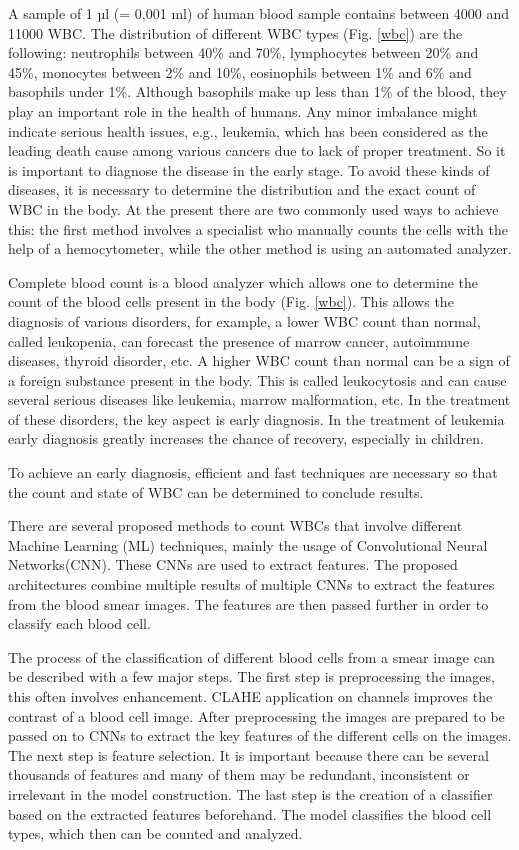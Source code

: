 A sample of 1 µl (= 0,001 ml) of human blood sample contains between 4000 and 11000 WBC. The distribution of different WBC types (Fig. \ref{wbc}) are the following: neutrophils between 40\% and 70\%, lymphocytes between 20\% and 45\%, monocytes between 2\% and 10\%, eosinophils between 1\% and 6\% and basophils under 1\%. Although basophils make up less than 1\% of the blood, they play an important role in the health of humans. Any minor imbalance might indicate serious health issues, e.g., leukemia,
\cite{AcuteLymphocyticLeukemia}
which has been considered as the leading death cause among various cancers due to lack of proper treatment. So it is important to diagnose the disease in the early stage. To avoid these kinds of diseases, it is necessary to determine the distribution and the exact count of WBC in the body. At the present there are two commonly used ways to achieve this: the first method involves a specialist who manually counts the cells with the help of a hemocytometer, while the other method is using an automated analyzer.
\cite{HemocytometerCounting}


Complete blood count
\cite{CBC}
is a blood analyzer which allows one to determine the count of the blood cells present in the body (Fig. \ref{wbc}). This allows the diagnosis of various disorders, for example, a lower WBC count than normal, called leukopenia, can forecast the presence of marrow cancer, autoimmune diseases, thyroid disorder, etc. A higher WBC count than normal can be a sign of a foreign substance present in the body. This is called leukocytosis and can cause several serious diseases like leukemia, marrow malformation, etc. In the treatment of these disorders, the key aspect is early diagnosis. In the treatment of leukemia early diagnosis greatly increases the chance of recovery, especially in children.



To achieve an early diagnosis, efficient and fast techniques are necessary so that the count and state of WBC can be determined to conclude results. 

There are several proposed methods to count WBCs that involve different Machine Learning (ML) techniques, mainly the usage of Convolutional Neural Networks(CNN). These CNNs are used to extract features. The proposed architectures combine multiple results of multiple CNNs to extract the features from the blood smear images. The features are then passed further in order to classify each blood cell.

The process of the classification of different blood cells from a smear image can be described with a few major steps. The first step is preprocessing the images, this often involves enhancement. CLAHE
\cite{CLAHE}
application on channels improves the contrast of a blood cell image. After preprocessing the images are prepared to be passed on to CNNs to extract the key features of the different cells on the images. The next step is feature selection. It is important because there can be several thousands of features and many of them may be redundant, inconsistent or irrelevant in the model construction. The last step is the creation of a classifier based on the extracted features beforehand. The model classifies the blood cell types, which then can be counted and analyzed.

